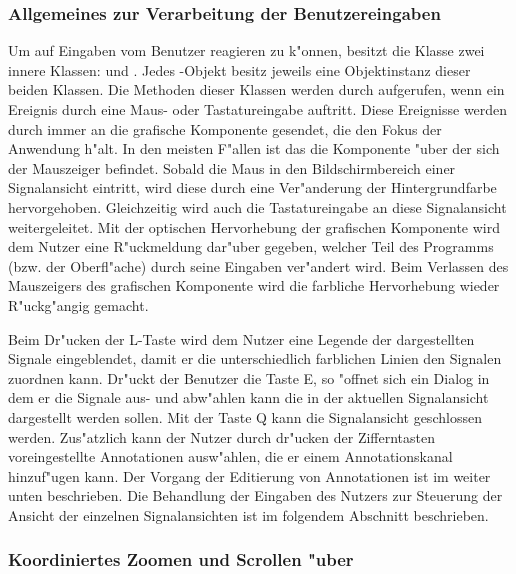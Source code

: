 \subsubsection{Allgemeines zur Verarbeitung der Benutzereingaben}

Um auf Eingaben vom Benutzer reagieren zu k"onnen, besitzt die Klasse  zwei innere Klassen:  und .
Jedes -Objekt besitz jeweils eine Objektinstanz dieser beiden Klassen.
Die Methoden dieser Klassen werden durch aufgerufen, wenn ein Ereignis durch eine Maus- oder Tastatureingabe auftritt.
Diese Ereignisse werden durch \java immer an die grafische Komponente gesendet, die den Fokus der Anwendung h"alt.
In den meisten F"allen ist das die Komponente "uber der sich der Mauszeiger befindet.
Sobald die Maus in den Bildschirmbereich einer Signalansicht eintritt, wird diese durch eine Ver"anderung der Hintergrundfarbe hervorgehoben.
Gleichzeitig wird auch die Tastatureingabe an diese Signalansicht weitergeleitet.
Mit der optischen Hervorhebung der grafischen Komponente wird dem Nutzer eine R"uckmeldung dar"uber gegeben, welcher Teil des Programms (bzw. der Oberfl"ache) durch seine Eingaben ver"andert wird.
Beim Verlassen des Mauszeigers des grafischen Komponente wird die farbliche Hervorhebung wieder R"uckg"angig gemacht.

Beim Dr"ucken der L-Taste wird dem Nutzer eine Legende der dargestellten Signale eingeblendet, damit er die unterschiedlich farblichen Linien den Signalen zuordnen kann.
Dr"uckt der Benutzer die Taste E, so "offnet sich ein Dialog in dem er die Signale aus- und abw"ahlen kann die in der aktuellen Signalansicht dargestellt werden sollen.
Mit der Taste Q kann die Signalansicht geschlossen werden.
Zus"atzlich kann der Nutzer durch dr"ucken der Zifferntasten voreingestellte Annotationen ausw"ahlen, die er einem Annotationskanal hinzuf"ugen kann.
Der Vorgang der Editierung von Annotationen ist im  weiter unten beschrieben.
Die Behandlung der Eingaben des Nutzers zur Steuerung der Ansicht der einzelnen Signalansichten ist im folgendem Abschnitt beschrieben.


\subsubsection{Koordiniertes Zoomen und Scrollen "uber }

